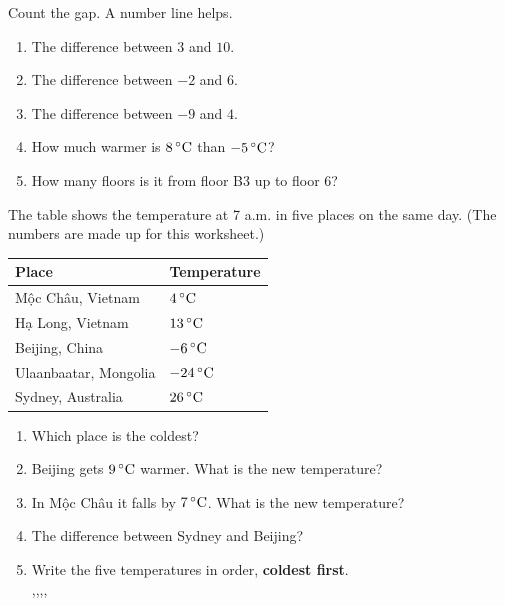 \documentclass[12pt,a4paper]{article}
\begin{document}
\noindent Count the gap. A number line helps.

\vspace{4pt}
\begin{enumerate}[label=(\alph*), itemsep=10pt]
  \item The difference between $3$ and $10$. \hfill \blank[2.6cm]
  \item The difference between $-2$ and $6$. \hfill \blank[2.6cm]
  \item The difference between $-9$ and $4$. \hfill \blank[2.6cm]
  \item How much warmer is $8\,^{\circ}\mathrm{C}$ than $-5\,^{\circ}\mathrm{C}$? \hfill \blank[2.6cm]
  \item How many floors is it from floor B3 up to floor 6? \hfill \blank[2.6cm]
\end{enumerate}


\noindent The table shows the temperature at 7 a.m. in five places on the same day.
{\small\color{black!60}(The numbers are made up for this worksheet.)}

\vspace{8pt}
\begin{center}
\begin{tabular}{|p{5.2cm}|p{3.4cm}|}
  \hline
  \rule{0pt}{1.5em}\textbf{Place} & \textbf{Temperature} \\ \hline
  \rule{0pt}{1.5em}M\d{\^o}c Ch\^au, Vietnam & $4\,^{\circ}\mathrm{C}$ \\ \hline
  \rule{0pt}{1.5em}H\d{a} Long, Vietnam & $13\,^{\circ}\mathrm{C}$ \\ \hline
  \rule{0pt}{1.5em}Beijing, China & $-6\,^{\circ}\mathrm{C}$ \\ \hline
  \rule{0pt}{1.5em}Ulaanbaatar, Mongolia & $-24\,^{\circ}\mathrm{C}$ \\ \hline
  \rule{0pt}{1.5em}Sydney, Australia & $26\,^{\circ}\mathrm{C}$ \\ \hline
\end{tabular}
\end{center}

\begin{enumerate}[label=(\alph*), itemsep=11pt]
  \item Which place is the coldest? \hfill \blank[4.2cm]
  \item Beijing gets $9\,^{\circ}\mathrm{C}$ warmer. What is the new temperature? \hfill \blank[2.4cm]
  \item In M\d{\^o}c Ch\^au it falls by $7\,^{\circ}\mathrm{C}$. What is the new temperature? \hfill \blank[2.4cm]
  \item The difference between Sydney and Beijing? \hfill \blank[2.4cm]
  \item Write the five temperatures in order, \textbf{coldest first}. \\[6pt]
        \blank[2.2cm],\quad \blank[2.2cm],\quad \blank[2.2cm],\quad \blank[2.2cm],\quad \blank[2.2cm]
\end{enumerate}
\end{document}
